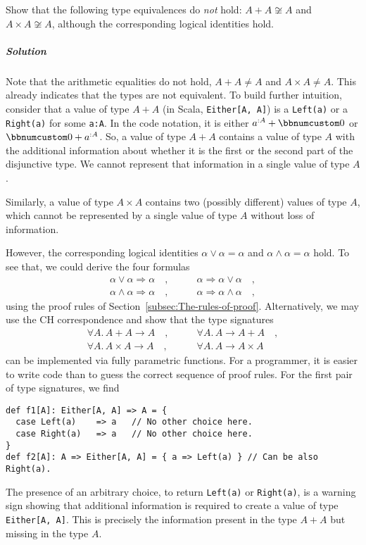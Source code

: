 Show that the following type equivalences do \emph{not} hold: $A+A\not\cong A$
and $A\times A\not\cong A$, although the corresponding logical identities
hold.

\subparagraph{Solution}

Note that the arithmetic equalities do not hold, $A+A\neq A$ and
$A\times A\ne A$. This already indicates that the types are not equivalent.
To build further intuition, consider that a value of type $A+A$ (in
Scala, \lstinline!Either[A, A]!) is a \lstinline!Left(a)! or a \lstinline!Right(a)!
for some \lstinline!a:A!. In the code notation, it is either $a^{:A}+\bbnum 0$
or $\bbnum 0+a^{:A}$. So, a value of type $A+A$ contains a value
of type $A$ with the additional information about whether it is the
first or the second part of the disjunctive type. We cannot represent
that information in a single value of type $A$. 

Similarly, a value of type $A\times A$ contains two (possibly different)
values of type $A$, which cannot be represented by a single value
of type $A$ without loss of information.

However, the corresponding logical identities $\alpha\vee\alpha=\alpha$
and $\alpha\wedge\alpha=\alpha$ hold. To see that, we could derive
the four formulas
\begin{align*}
\alpha\vee\alpha\Rightarrow\alpha\quad, & \quad\quad\alpha\Rightarrow\alpha\vee\alpha\quad,\\
\alpha\wedge\alpha\Rightarrow\alpha\quad, & \quad\quad\alpha\Rightarrow\alpha\wedge\alpha\quad,
\end{align*}
using the proof rules of Section~\ref{subsec:The-rules-of-proof}.
Alternatively, we may use the CH correspondence and show that the
type signatures
\begin{align*}
\forall A.\,A+A\rightarrow A\quad, & \quad\quad\forall A.\,A\rightarrow A+A\quad,\\
\forall A.\,A\times A\rightarrow A\quad, & \quad\quad\forall A.\,A\rightarrow A\times A\quad
\end{align*}
can be implemented via fully parametric functions. For a programmer,
it is easier to write code than to guess the correct sequence of proof
rules. For the first pair of type signatures, we find
\begin{lstlisting}
def f1[A]: Either[A, A] => A = {
  case Left(a)    => a   // No other choice here.
  case Right(a)   => a   // No other choice here.
}
def f2[A]: A => Either[A, A] = { a => Left(a) } // Can be also Right(a).
\end{lstlisting}
The presence of an arbitrary choice, to return \lstinline!Left(a)!
or \lstinline!Right(a)!, is a warning sign showing that additional
information is required to create a value of type \lstinline!Either[A, A]!.
This is precisely the information present in the type $A+A$ but missing
in the type $A$.


